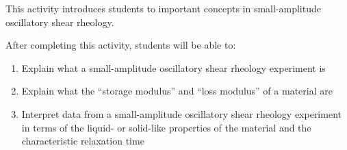 %
%
%
%

\renewcommand{\figpath}{content/polymphys/mechanical-properties/SAOS/figs}
\newcommand{\labelbase}{}
\renewcommand{\labelbase}{viscoelasticity}

\begin{activity}

\begin{instructornotes}

	This activity introduces students to important concepts in small-amplitude oscillatory shear rheology.
	
	After completing this activity, students will be able to:
			\begin{enumerate}
				\item Explain what a small-amplitude oscillatory shear rheology experiment is
				\item Explain what the ``storage modulus'' and ``loss modulus'' of a material are
				\item Interpret data from a small-amplitude oscillatory shear rheology experiment in terms of the liquid- or solid-like properties of the material and the characteristic relaxation time
			\end{enumerate}
	
			

\end{instructornotes}
\end{activity}
